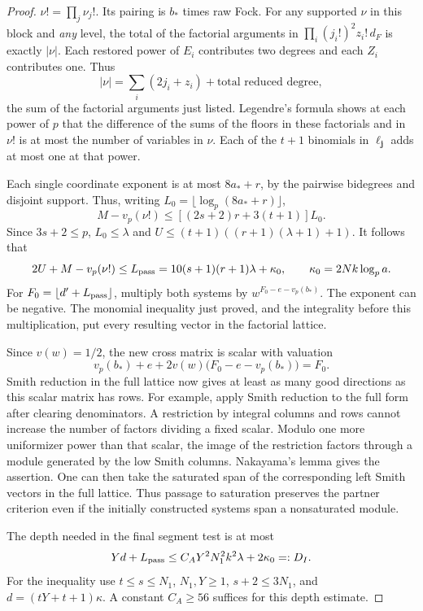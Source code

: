 \begin{proof}
\(\nu!=\prod_j\nu_j!\). Its pairing is \(b_*\) times raw Fock.
For any supported \(\nu\) in this block and \emph{any} level,
the total of the factorial arguments in
\(\prod_i(j_i!)^2 z_i!\, d_F\) is exactly \(|\nu|\).
Each restored power of \(E_i\) contributes two degrees and each \(Z_i\) contributes one. Thus
\[
 |\nu|=\sum_i (2j_i+z_i)+\text{total reduced degree},
\]
the sum of the factorial arguments just listed. Legendre's formula shows at
each power of \(p\) that the difference of the sums of the
floors in these factorials and in \(\nu!\) is at most the number
of variables in \(\nu\). Each of the \(t+1\) binomials in
\(\ell_{\mathbf j}\) adds at most one at that power.

Each single
coordinate exponent is at most \(8a_*+r\), by the pairwise
bidegrees and disjoint support. Thus, writing
\(L_0=\lfloor\log_p(8a_*+r)\rfloor\),
\[
 M-v_p(\nu!)\le [(2s+2)r+3(t+1)]L_0.
\]
Since \(3s+2\le p\), \(L_0\le\lambda\) and
\(U\le(t+1)((r+1)(\lambda+1)+1)\).
It follows that
\[
 2U+M-v_p(\nu!)\le
 L_{\rm pass}=10(s+1)(r+1)\lambda+\kappa_0,\qquad
 \kappa_0=2Nk\log_p a .
\]
For \(F_0=\lfloor d'+L_{\rm pass}\rfloor\), multiply both systems
by \(w^{F_0-e-v_p(b_*)}\). The exponent can be negative.
The monomial inequality just proved, and the integrality before
this multiplication, put every resulting vector in the factorial
lattice.

Since \(v(w)=1/2\), the new cross matrix is scalar with valuation
\[
 v_p(b_*)+e+2v(w)\bigl(F_0-e-v_p(b_*)\bigr)=F_0.
\]
Smith reduction in the full lattice now gives at least
as many good directions as this scalar matrix has rows. For
example, apply Smith reduction to the full form after clearing
denominators. A restriction by integral columns and rows cannot
increase the number of factors dividing a fixed scalar. Modulo
one more uniformizer power than that scalar, the image of the
restriction factors through a module generated by the low Smith
columns. Nakayama's lemma gives the assertion. One can then take
the saturated span of the corresponding left Smith vectors in the
full lattice. Thus passage to saturation preserves the partner
criterion even if the initially constructed systems span a
nonsaturated module.

The depth needed in the final segment test is at most
\[
 Yd+L_{\rm pass}\le C_A Y^2 N_1^2 k^2\lambda+2\kappa_0=:D_I .
\]
For the inequality use \(t\le s\le N_1\), \(N_1,Y\ge1\),
\(s+2\le3N_1\), and \(d=(tY+t+1)\kappa\). A constant
\(C_A\ge56\) suffices for this depth estimate.


\end{proof}
